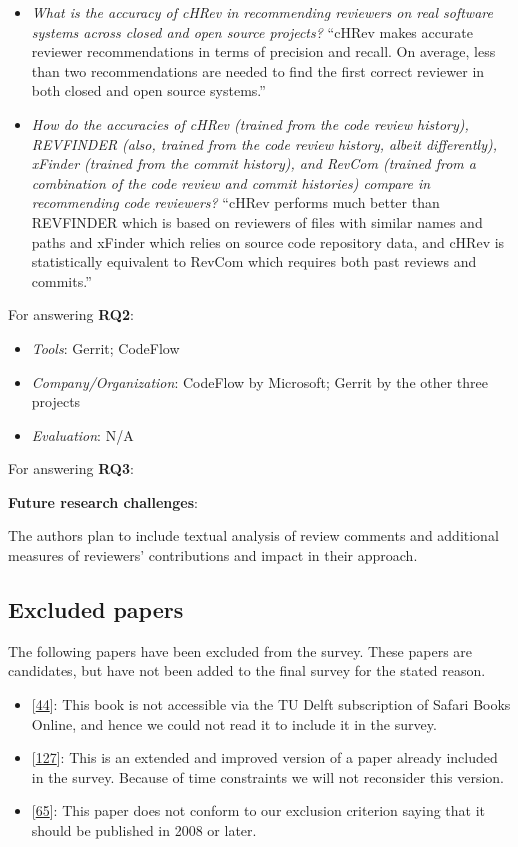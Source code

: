 \documentclass[]{book}
\providecommand{\tightlist}{%
  \setlength{\itemsep}{0pt}\setlength{\parskip}{0pt}}
\begin{document}
\begin{itemize}
\item
  \emph{What is the accuracy of cHRev in recommending reviewers on real
  software systems across closed and open source projects?} ``cHRev
  makes accurate reviewer recommendations in terms of precision and
  recall. On average, less than two recommendations are needed to find
  the first correct reviewer in both closed and open source systems.''
\item
  \emph{How do the accuracies of cHRev (trained from the code review
  history), REVFINDER (also, trained from the code review history,
  albeit differently), xFinder (trained from the commit history), and
  RevCom (trained from a combination of the code review and commit
  histories) compare in recommending code reviewers?} ``cHRev performs
  much better than REVFINDER which is based on reviewers of files with
  similar names and paths and xFinder which relies on source code
  repository data, and cHRev is statistically equivalent to RevCom which
  requires both past reviews and commits.''
\end{itemize}

For answering \textbf{RQ2}:

\begin{itemize}
\tightlist
\item
  \emph{Tools}: Gerrit; CodeFlow
\item
  \emph{Company/Organization}: CodeFlow by Microsoft; Gerrit by the
  other three projects
\item
  \emph{Evaluation}: N/A
\end{itemize}

For answering \textbf{RQ3}:

\textbf{Future research challenges}:

The authors plan to include textual analysis of review comments and
additional measures of reviewers' contributions and impact in their
approach.

\subsection{Excluded papers}\label{excluded-papers}

The following papers have been excluded from the survey. These papers
are candidates, but have not been added to the final survey for the
stated reason.

\begin{itemize}
\tightlist
\item
  {[}\protect\hyperlink{ref-cohen2010modern}{44}{]}: This book is not
  accessible via the TU Delft subscription of Safari Books Online, and
  hence we could not read it to include it in the survey.
\item
  {[}\protect\hyperlink{ref-mcintosh2016empirical}{127}{]}: This is an
  extended and improved version of a paper already included in the
  survey. Because of time constraints we will not reconsider this
  version.
\item
  {[}\protect\hyperlink{ref-fagan2002design}{65}{]}: This paper does not
  conform to our exclusion criterion saying that it should be published
  in 2008 or later.
\end{itemize}
\end{document}
